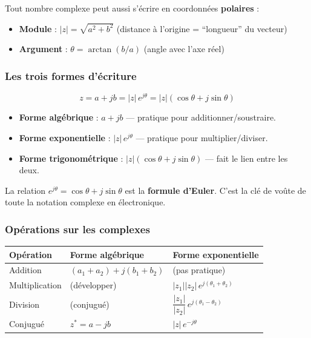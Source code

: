 \documentclass[12pt,a4paper,twoside]{book}
\begin{document}
Tout nombre complexe peut aussi s'écrire en coordonnées \textbf{polaires} :
\begin{itemize}[nosep]
\item \textbf{Module} : $|z| = \sqrt{a^2 + b^2}$ (distance à l'origine = ``longueur'' du vecteur)
\item \textbf{Argument} : $\theta = \arctan(b/a)$ (angle avec l'axe réel)
\end{itemize}

\subsubsection*{Les trois formes d'écriture}

\begin{formule}
\[
\boxed{z = a + jb = |z|\,e^{j\theta} = |z|(\cos\theta + j\sin\theta)}
\]
\begin{itemize}[nosep]
\item \textbf{Forme algébrique} : $a + jb$ --- pratique pour additionner/soustraire.
\item \textbf{Forme exponentielle} : $|z|\,e^{j\theta}$ --- pratique pour multiplier/diviser.
\item \textbf{Forme trigonométrique} : $|z|(\cos\theta + j\sin\theta)$ --- fait le lien entre les deux.
\end{itemize}
\end{formule}

La relation $e^{j\theta} = \cos\theta + j\sin\theta$ est la \textbf{formule d'Euler}. C'est la clé de voûte de toute la notation complexe en électronique.

\subsubsection*{Opérations sur les complexes}

\begin{center}
\renewcommand{\arraystretch}{1.5}
\begin{tabular}{lll}
\toprule
\textbf{Opération} & \textbf{Forme algébrique} & \textbf{Forme exponentielle} \\
\midrule
Addition & $(a_1+a_2) + j(b_1+b_2)$ & (pas pratique) \\
Multiplication & (développer) & $|z_1||z_2|\,e^{j(\theta_1+\theta_2)}$ \\
Division & (conjugué) & $\dfrac{|z_1|}{|z_2|}\,e^{j(\theta_1-\theta_2)}$ \\
Conjugué & $z^* = a - jb$ & $|z|\,e^{-j\theta}$ \\
\bottomrule
\end{tabular}
\end{center}
\end{document}
